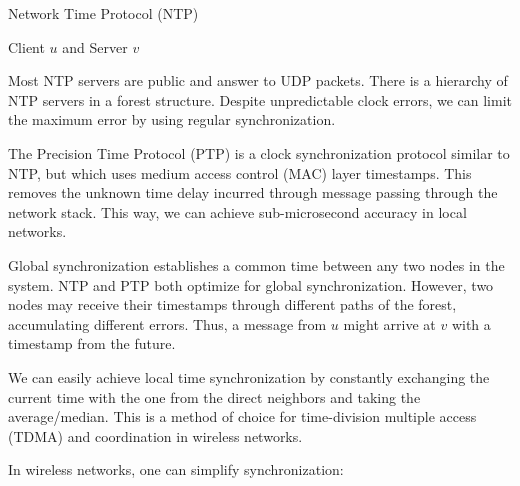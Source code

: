 \begin{algorithm}[H]
\caption{Network Time Protocol (NTP)}
	Client $u$ and Server $v$
	
	\BlankLine
	
\end{algorithm}
\medskip

Most NTP servers are public and answer to UDP packets. There is a hierarchy of NTP servers in a forest structure. Despite unpredictable clock errors, we can limit the maximum error by using regular synchronization. \medskip

The Precision Time Protocol (PTP) is a clock synchronization protocol similar to NTP, but which uses medium access control (MAC) layer timestamps. This removes the unknown time delay incurred through message passing through the network stack. This way, we can achieve sub-microsecond accuracy in local networks. \medskip

Global synchronization establishes a common time between any two nodes in the system. NTP and PTP both optimize for global synchronization. However, two nodes may receive their timestamps through different paths of the forest, accumulating different errors. Thus, a message from $u$ might arrive at $v$ with a timestamp from the future. \medskip

We can easily achieve local time synchronization by constantly exchanging the current time with the one from the direct neighbors and taking the average/median. This is a method of choice for time-division multiple access (TDMA) and coordination in wireless networks. \medskip

In wireless networks, one can simplify synchronization:\medskip

